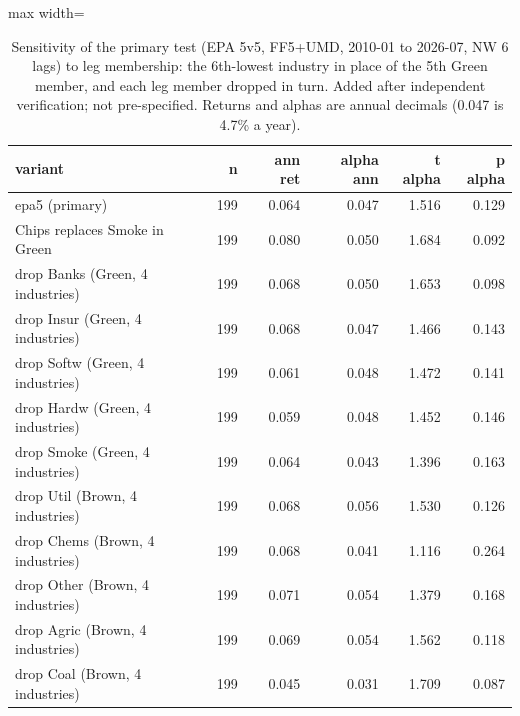 \begin{table}[H]
\centering\small
\caption{Sensitivity of the primary test (EPA 5v5, FF5+UMD, 2010-01 to 2026-07, NW 6 lags) to leg membership: the 6th-lowest industry in place of the 5th Green member, and each leg member dropped in turn. Added after independent verification; not pre-specified. Returns and alphas are annual decimals (0.047 is 4.7\% a year).}
\label{tab:m4_sensitivity}
\begin{adjustbox}{max width=\linewidth}
\begin{tabular}{lrrrrr}
\toprule
variant & n & ann ret & alpha ann & t alpha & p alpha \\
\midrule
epa5 (primary) & 199 & 0.064 & 0.047 & 1.516 & 0.129 \\
Chips replaces Smoke in Green & 199 & 0.080 & 0.050 & 1.684 & 0.092 \\
drop Banks (Green, 4 industries) & 199 & 0.068 & 0.050 & 1.653 & 0.098 \\
drop Insur (Green, 4 industries) & 199 & 0.068 & 0.047 & 1.466 & 0.143 \\
drop Softw (Green, 4 industries) & 199 & 0.061 & 0.048 & 1.472 & 0.141 \\
drop Hardw (Green, 4 industries) & 199 & 0.059 & 0.048 & 1.452 & 0.146 \\
drop Smoke (Green, 4 industries) & 199 & 0.064 & 0.043 & 1.396 & 0.163 \\
drop Util (Brown, 4 industries) & 199 & 0.068 & 0.056 & 1.530 & 0.126 \\
drop Chems (Brown, 4 industries) & 199 & 0.068 & 0.041 & 1.116 & 0.264 \\
drop Other (Brown, 4 industries) & 199 & 0.071 & 0.054 & 1.379 & 0.168 \\
drop Agric (Brown, 4 industries) & 199 & 0.069 & 0.054 & 1.562 & 0.118 \\
drop Coal (Brown, 4 industries) & 199 & 0.045 & 0.031 & 1.709 & 0.087 \\
\bottomrule
\end{tabular}
\end{adjustbox}
\end{table}
